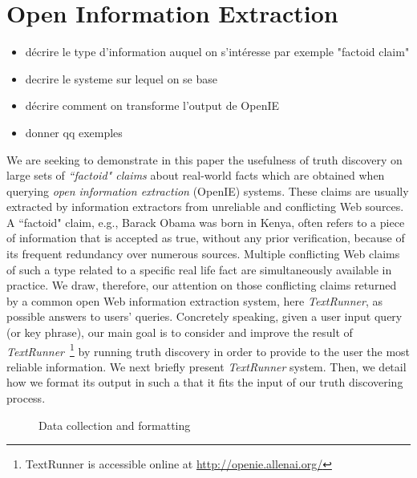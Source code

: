 \section{Open Information Extraction}
\begin{itemize}
 \item décrire le type d'information auquel on s'intéresse par exemple "factoid claim"
 \item decrire le systeme sur lequel on se base
 \item décrire comment on transforme l'output de OpenIE
 \item donner qq exemples
\end{itemize}

\medskip

We are seeking to demonstrate in this paper the usefulness of truth discovery on large sets of 
\emph{``factoid" claims} about real-world facts which are obtained when querying \emph{open information
extraction} (OpenIE) systems. These claims are usually extracted by information extractors from unreliable
and conflicting Web sources.
A ``factoid" claim, e.g.,  \textsf{Barack Obama was born in Kenya}, often refers to a piece of 
information that is accepted as true, without any prior verification, because of its frequent redundancy
over numerous sources. Multiple conflicting Web claims of such a type related to a specific real life fact 
are simultaneously available in practice. We draw, therefore, our attention on those conflicting claims 
returned by a common open Web information extraction system, here \emph{TextRunner}, as possible answers to users' queries. 
Concretely speaking, given a user input query (or key phrase), our main goal is to consider and improve the result of \emph{TextRunner}~\footnote{TextRunner is accessible online at \href{http://openie.allenai.o, rg/}{http://openie.allenai.org/}}
by running truth discovery in order to provide to the user the most reliable information.
We next briefly present \emph{TextRunner} system. Then, we detail how we format its output in such a that
it fits the input of our truth discovering process.


\begin{figure*}[!ht]
\begin{subfigure}[TextRunner Extraction]{Un exemple d'extraction avec TextRunner}
\end{subfigure}
\hfill
\begin{subfigure}[Extracted Triplets]{Un exemple de tripl\'es extraites}
\end{subfigure}
\label{open}\caption{Data collection and formatting}
\end{figure*}

